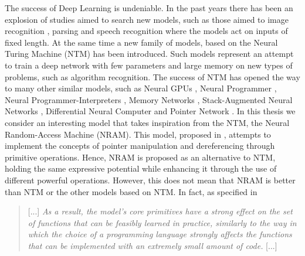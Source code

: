 The success of Deep Learning is undeniable. In the past years there has been an explosion of studies aimed to search new models, such as those aimed to image recognition \cite{Krizhevsky2012ImageNetCW}, parsing \cite{Vinyals2015GrammarAA} and speech recognition \cite{Chan2015ListenAA} where the models act on inputs of fixed length. At the same time a new family of models, based on the Neural Turing Machine (NTM) \cite{Graves2014NeuralTM} has been introduced. Such models represent an attempt to train a deep network with few parameters and large memory on new types of problems, such as algorithm recognition. The success of NTM has opened the way to many other similar models, such as Neural GPUs \cite{Kaiser2015NeuralGL}, Neural Programmer \cite{Neelakantan2015NeuralPI}, Neural Programmer-Interpreters \cite{Reed2015NeuralP}, Memory Networks \cite{Weston2014MemoryN}, Stack-Augmented Neural Networks \cite{Joulin2015InferringAP}, Differential Neural Computer \cite{Graves2016HybridCU} and Pointer Network \cite{Vinyals2015PointerN}.
\newline \newline
In this thesis we consider an interesting model that takes inspiration from the NTM, the Neural Random-Access Machine (NRAM). This model, proposed in \cite{NRAM:2016}, attempts to implement the concepts of pointer manipulation and dereferencing through primitive operations.
Hence, NRAM is proposed as an alternative to NTM, holding the same expressive potential while enhancing it through the use of different powerful operations. However, this does not mean that NRAM is better than NTM or the other models based on NTM. In fact, as specified in \cite{NRAM:2016}
\begin{quote}
[...] \textit{As a result, the model’s core primitives have a strong effect on the set of functions that can be feasibly learned in practice, similarly to the way in which the choice of a programming language strongly affects the functions that can be implemented with an extremely small amount of code.} [...]
\end{quote}

